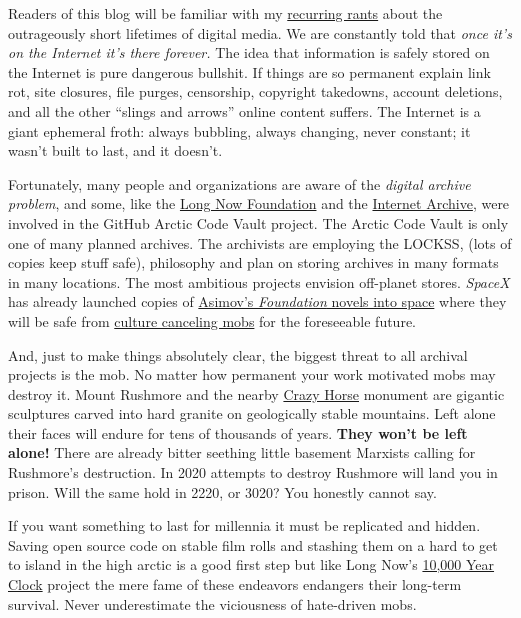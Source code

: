 Readers of this blog will be familiar with my
\href{https://analyzethedatanotthedrivel.org/2010/12/06/soon-we-will-all-be-software-archeologists/}{recurring
rants} about the outrageously short lifetimes of digital media. We are
constantly told that \emph{once it's on the Internet it's there
forever.} The idea that information is safely stored on the Internet is
pure dangerous bullshit. If things are so permanent explain link rot,
site closures, file purges, censorship, copyright takedowns, account
deletions, and all the other ``slings and arrows'' online content
suffers. The Internet is a giant ephemeral froth: always bubbling,
always changing, never constant; it wasn't built to last, and it
doesn't.

Fortunately, many people and organizations are aware of the
\emph{digital archive problem}, and some, like the
\href{http://longnow.org/}{Long Now Foundation} and the
\href{https://en.wikipedia.org/wiki/Internet_Archive}{Internet Archive},
were involved in the GitHub Arctic Code Vault project. The Arctic Code
Vault is only one of many planned archives. The archivists are employing
the LOCKSS, (lots of copies keep stuff safe), philosophy and plan on
storing archives in many formats in many locations. The most ambitious
projects envision off-planet stores. \emph{SpaceX} has already launched
copies of
\href{https://techcrunch.com/2018/02/09/the-special-data-device-spacexs-falcon-heavy-sent-to-orbit-is-just-the-start/}{Asimov's
\emph{Foundation} novels into space} where they will be safe from
\href{https://www.realclearpolitics.com/articles/2020/06/27/think_the_cancel_mobs_cant_get_any_worse_think_again.html}{culture
canceling mobs} for the foreseeable future.

And, just to make things absolutely clear, the biggest threat to all
archival projects is the mob. No matter how permanent your work
motivated mobs may destroy it. Mount Rushmore and the nearby
\href{https://crazyhorsememorial.org/}{Crazy Horse} monument are
gigantic sculptures carved into hard granite on geologically stable
mountains. Left alone their faces will endure for tens of thousands of
years. \textbf{They won't be left alone!} There are already bitter
seething little basement Marxists calling for Rushmore's destruction. In
2020 attempts to destroy Rushmore will land you in prison. Will the same
hold in 2220, or 3020? You honestly cannot say.

If you want something to last for millennia it must be replicated and
hidden. Saving open source code on stable film rolls and stashing them
on a hard to get to island in the high arctic is a good first step but
like Long Now's
\href{http://www.10000yearclock.net/learnmore.html}{10,000 Year Clock}
project the mere fame of these endeavors endangers their long-term
survival. Never underestimate the viciousness of hate-driven mobs.

